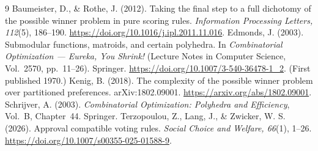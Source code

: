 \documentclass[11pt,a4paper]{article}
\theoremstyle{definition}
\theoremstyle{remark}
\begin{document}
\small
\begin{thebibliography}{9}\setlength{\itemsep}{1pt}
 Baumeister, D., \& Rothe, J. (2012). Taking the final step to a full dichotomy of the possible winner problem in pure scoring rules. \emph{Information Processing Letters, 112}(5), 186--190. \url{https://doi.org/10.1016/j.ipl.2011.11.016}.
 Edmonds, J. (2003). Submodular functions, matroids, and certain polyhedra. In \emph{Combinatorial Optimization --- Eureka, You Shrink!} (Lecture Notes in Computer Science, Vol.~2570, pp.~11--26). Springer. \url{https://doi.org/10.1007/3-540-36478-1_2}. (First published 1970.)
 Kenig, B. (2018). The complexity of the possible winner problem over partitioned preferences. arXiv:1802.09001. \url{https://arxiv.org/abs/1802.09001}.
 Schrijver, A. (2003). \emph{Combinatorial Optimization: Polyhedra and Efficiency}, Vol.~B, Chapter~44. Springer.
 Terzopoulou, Z., Lang, J., \& Zwicker, W. S. (2026). Approval compatible voting rules. \emph{Social Choice and Welfare, 66}(1), 1--26. \url{https://doi.org/10.1007/s00355-025-01588-9}.
\end{thebibliography}
\end{document}
